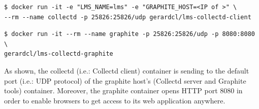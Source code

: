 \begin{verbatim}
$ docker run -it -e "LMS_NAME=lms" -e "GRAPHITE_HOST=<IP of >" \
--rm --name collectd -p 25826:25826/udp gerardcl/lms-collectd-client
\end{verbatim}

\begin{verbatim}
$ docker run -it --rm --name graphite -p 25826:25826/udp -p 8080:8080 \
gerardcl/lms-collectd-graphite
\end{verbatim}

As shown, the collectd (i.e.: Collectd client) container is sending to the default port (i.e.: UDP protocol) of the graphite host's (Collectd server and Graphite tools) container. Moreover, the graphite container opens HTTP port 8080 in order to enable browsers to get access to its web application anywhere. 
